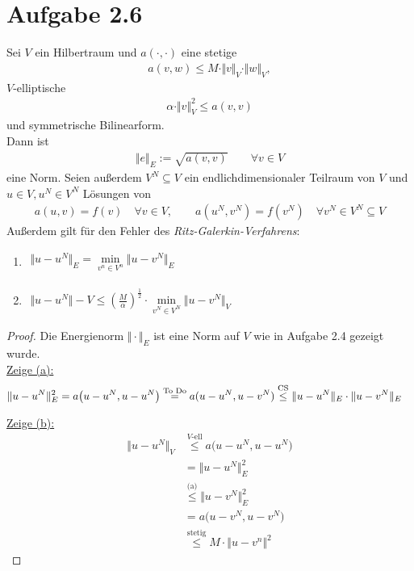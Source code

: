 \documentclass[12pt,a4paper]{article}
\begin{document}
\section*{Aufgabe 2.6}
Sei $V$ ein Hilbertraum und  $a(\cdot,\cdot)$ eine stetige
\begin{align*}
a(v,w)\leq M\cdot\Vert v\Vert_V\cdot\Vert w\Vert_V,
\end{align*}
$V$-elliptische
\begin{align*}
\alpha\cdot\Vert v\Vert^2_V\leq a(v,v)
\end{align*}
und symmetrische Bilinearform.\\
Dann ist
\begin{align*}
\Vert e\Vert_E:=\sqrt{a(v,v)}\qquad\forall v\in V
\end{align*}
eine Norm. Seien außerdem $V^N\subseteq V$ ein endlichdimensionaler Teilraum von $V$ und $u\in V,u^N\in V^N$ Lösungen von
\begin{align*}
a(u,v)=f(v)\quad\forall v\in V,\qquad a(u^N,v^N)=f(v^N)\quad\forall v^N\in V^N\subseteq V
\end{align*}
Außerdem gilt für den Fehler des \textit{Ritz-Galerkin-Verfahrens}:
\begin{enumerate}[label=(\alph*)]
\item $\begin{aligned}
\Vert u-u^N\Vert_E=\min\limits_{v^n\in V^n}\Vert u-v^N\Vert_E
\end{aligned}$
\item $\begin{aligned}
\Vert u-u^N\Vert-V\leq\left(\frac{M}{\alpha}\right)^{\frac{1}{2}}\cdot\min\limits_{v^N\in V^N}\Vert u-v^N\Vert_V
\end{aligned}$
\end{enumerate}
\begin{proof}
Die Energienorm $\Vert\cdot\Vert_E$ ist eine Norm auf $V$ wie in Aufgabe 2.4 gezeigt wurde.\\

\underline{Zeige (a):}
\begin{align*}
\Vert u-u^N\Vert_E^2
&=a\big(u-u^N,u-u^N\big)
\stackrel{\text{To Do}}{=}
a(u-u^N,u-v^N)
\stackrel{\text{CS}}{\leq}
\Vert u-u^N\Vert_E\cdot\Vert u-v^N\Vert_E
\end{align*}

\underline{Zeige (b):}
\begin{align*}
\Vert u-u^N\Vert_V
&\stackrel{V\text{-ell}}{\leq}
a\big(u-u^N,u-u^N\big)\\
&=\big\Vert u-u^N\big\Vert^2_E\\
&\stackrel{\text{(a)}}{\leq}
\big\Vert u-v^N\big\Vert^2_E\\
&=a\big(u-v^N,u-v^N\big)\\
&\stackrel{\text{stetig}}{\leq}
M\cdot\big\Vert u-v^n\big\Vert^2
\end{align*}
\end{proof}
\end{document}
